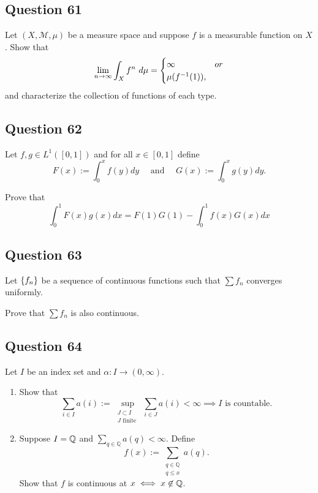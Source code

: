 \documentclass[12pt]{article}
\begin{document}
\hypertarget{question-61-1}{%
\subsection{Question 61}\label{question-61-1}}

Let \((X, \mathcal M, \mu)\) be a measure space and suppose \(f\) is a
measurable function on \(X\). Show that \[
\lim _{n \rightarrow \infty} \int_{X} f^{n} ~d \mu =
\begin{cases}
\infty & or \\
\mu(f^{-1}(1)),
\end{cases}
\] and characterize the collection of functions of each type.

\hypertarget{question-62-1}{%
\subsection{Question 62}\label{question-62-1}}

Let \(f, g \in L^1([0, 1])\) and for all \(x\in [0, 1]\) define \[
F(x):=\int_{0}^{x} f(y) d y \quad \text { and } \quad G(x):=\int_{0}^{x} g(y) d y.
\]

Prove that \[
\int_{0}^{1} F(x) g(x) d x=F(1) G(1)-\int_{0}^{1} f(x) G(x) d x
\]

\hypertarget{question-63-1}{%
\subsection{Question 63}\label{question-63-1}}

Let \(\left\{{f_n}\right\}\) be a sequence of continuous functions such that
\(\sum f_n\) converges uniformly.

Prove that \(\sum f_n\) is also continuous.

\hypertarget{question-64-1}{%
\subsection{Question 64}\label{question-64-1}}

Let \(I\) be an index set and \(\alpha: I \to (0, \infty)\).

\begin{enumerate}
\def\labelenumi{\arabic{enumi}.}
\item
  Show that \[
  \sum_{i \in I} a(i):=\sup _{\substack{ J \subset I \\ J \text { finite }}} \sum_{i \in J} a(i)<\infty \implies I \text{ is countable.}
  \]
\item
  Suppose \(I = {\mathbb{Q}}\) and \(\sum_{q \in \mathbb{Q}} a(q)<\infty\).
  Define \[
  f(x):=\sum_{\substack{q \in \mathbb{Q}\\ q \leq x}} a(q).
  \] Show that \(f\) is continuous at \(x \iff x\not\in {\mathbb{Q}}\).
\end{enumerate}
\end{document}
